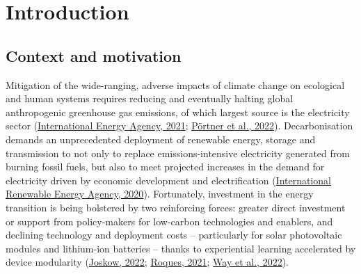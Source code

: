 \documentclass[12pt,a4paper,]{report}
\begin{document}
\newpage

\setcounter{page}{1}
\doublespacing
\setlength{\parindent}{0.5in}

\hypertarget{sec:intro}{%
\chapter{Introduction}\label{sec:intro}}

\hypertarget{context-and-motivation}{%
\section{Context and motivation}\label{context-and-motivation}}

Mitigation of the wide-ranging, adverse impacts of climate change on
ecological and human systems requires reducing and eventually halting
global anthropogenic greenhouse gas emissions, of which largest source
is the electricity sector
(\protect\hyperlink{ref-internationalenergyagencyNetZero20502021}{International
Energy Agency, 2021};
\protect\hyperlink{ref-portnerIPCC2022Climate2022}{Pörtner et al.,
2022}). Decarbonisation demands an unprecedented deployment of renewable
energy, storage and transmission to not only to replace
emissions-intensive electricity generated from burning fossil fuels, but
also to meet projected increases in the demand for electricity driven by
economic development and electrification
(\protect\hyperlink{ref-internationalrenewableenergyagencyGlobalRenewablesOutlook2020}{International
Renewable Energy Agency, 2020}). Fortunately, investment in the energy
transition is being bolstered by two reinforcing forces: greater direct
investment or support from policy-makers for low-carbon technologies and
enablers, and declining technology and deployment costs -- particularly
for solar photovoltaic modules and lithium-ion batteries -- thanks to
experiential learning accelerated by device modularity
(\protect\hyperlink{ref-joskowHierarchiesMarketsPartially2022}{Joskow,
2022}; \protect\hyperlink{ref-roquesEvolutionEuropeanModel2021a}{Roques,
2021}; \protect\hyperlink{ref-wayEmpiricallyGroundedTechnology2022}{Way
et al., 2022}).
\end{document}
